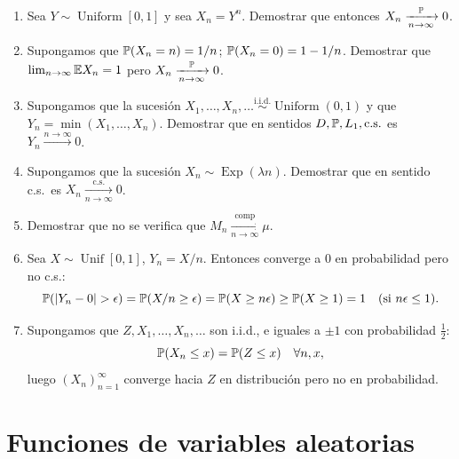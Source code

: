 \begin{enumerate}
        \[
          X_n(\omega) \coloneqq n^r \, \mathbf{1}_{\left(0, \frac{1}{n}\right]}(\omega) =
          \begin{cases}
            n^r, & \text{si } 0 \le \omega < \frac{1}{n}, \\
            0, & \omega \ge \frac{1}{n}.
          \end{cases}
        \]
        Demostrar que $X_n \xrightarrow[n\to\infty]{\Prob, \text{c.s.}} 0 \equiv X_\infty$, pero no hay convergencia de las medias ni en $L_1$ hacia $0$.
  \item Sea $Y \sim \operatorname{Uniform}[0, 1]$ y sea $X_n = Y^n$. Demostrar que entonces $X_n \xrightarrow[n\to\infty]{\mathbb{P}} 0$.
  \item Supongamos que $\mathbb{P}(X_n = n) = 1/n$; $\mathbb{P}(X_n = 0) = 1 - 1/n$. Demostrar que $\lim_{n\to\infty} \mathbb{E} X_n = 1$ pero $X_n \xrightarrow[n\to\infty]{\mathbb{P}} 0$.
  \item Supongamos que la sucesión $X_1, \dots, X_n, \dots \stackrel{\text{i.i.d.}}{\sim} \operatorname{Uniform}(0,1)$ y que $Y_n = \min(X_1, \dots, X_n)$. Demostrar que en sentidos $D, \mathbb{P}, L_1, \text{c.s.}$ es $Y_n \xrightarrow{n\to\infty} 0$.
  \item Supongamos que la sucesión $X_n \sim \operatorname{Exp}(\lambda n)$. Demostrar que en sentido c.s.\ es $X_n \xrightarrow[n\to\infty]{\text{c.s.}} 0$.
  \item Demostrar que no se verifica que $M_n \xrightarrow[n\to\infty]{\text{comp}} \mu$.
  \item Sea $X \sim \operatorname{Unif}[0,1]$, $Y_n = X/n$. Entonces converge a $0$ en probabilidad pero no c.s.:
        \[
          \mathbb{P}(|Y_n - 0| > \epsilon) = \mathbb{P}(X/n \ge \epsilon) = \mathbb{P}(X \ge n\epsilon) \ge \mathbb{P}(X \ge 1) = 1 \quad (\text{si } n\epsilon \le 1).
        \]
  \item Supongamos que $Z, X_1, \dots, X_n, \dots$ son i.i.d., e iguales a $\pm 1$ con probabilidad $\frac{1}{2}$:
        \[
          \mathbb{P}(X_n \le x) = \mathbb{P}(Z \le x) \quad \forall n, x,
        \]
        luego $(X_n)_{n=1}^\infty$ converge hacia $Z$ en distribución pero no en probabilidad.
\end{enumerate}

\chapter{Funciones de variables aleatorias}
